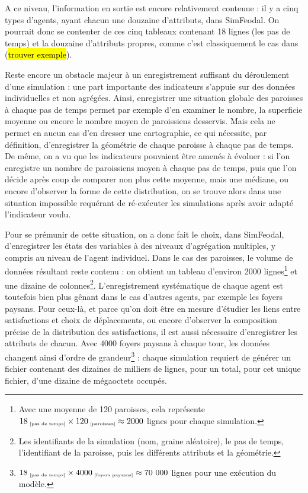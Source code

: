 	A ce niveau, l'information en sortie est encore relativement contenue : il y a cinq types d'agents, ayant chacun une douzaine d'attributs, dans SimFeodal. On pourrait donc se contenter de ces cinq tableaux contenant 18 lignes (les pas de temps) et la douzaine d'attributs propres, comme c'est classiquement le cas dans (\hl{trouver exemple}).

	Reste encore un obstacle majeur à un enregistrement suffisant du déroulement d'une simulation : une part importante des indicateurs s'appuie sur des données individuelles et non agrégées.
	Ainsi, enregistrer une situation globale des paroisses à chaque pas de temps permet par exemple d'en examiner le nombre, la superficie moyenne ou encore le nombre moyen de paroissiens desservis.
	Mais cela ne permet en aucun cas d'en dresser une cartographie, ce qui nécessite, par définition, d'enregistrer la géométrie de chaque paroisse à chaque pas de temps.
	De même, on a vu que les indicateurs pouvaient être amenés à évoluer : si l'on enregistre un nombre de paroissiens moyen à chaque pas de temps, puis que l'on décide après coup de comparer non plus cette moyenne, mais une médiane, ou encore d'observer la forme de cette distribution, on se trouve alors dans une situation impossible requérant de ré-exécuter les simulations après avoir adapté l'indicateur voulu.

	Pour se prémunir de cette situation, on a donc fait le choix, dans SimFeodal, d'enregistrer les états des variables à des niveaux d'agrégation multiples, y compris au niveau de l'agent individuel. Dans le cas des paroisses, le volume de données résultant reste contenu : on obtient un tableau d'environ 2000 lignes\footnote{
	Avec une moyenne de 120 paroisses, cela représente $18_{\text{\tiny ~[pas de temps]}} \times 120_{\text{\tiny ~[paroisses]}} \approx 2000$ lignes pour chaque simulation.
	} et une dizaine de colonnes\footnote{
	Les identifiants de la simulation (nom, graine aléatoire), le pas de temps, l'identifiant de la paroisse, puis les différents attributs et la géométrie.
	}.
	L'enregistrement systématique de chaque agent est toutefois bien plus gênant dans le cas d'autres agents, par exemple les foyers paysans. Pour ceux-là, et parce qu'on doit être en mesure d'étudier les liens entre satisfactions et choix de déplacements, ou encore d'observer la composition précise de la distribution des satisfactions, il est aussi nécessaire d'enregistrer les attributs de chacun. Avec $4000$ foyers paysans à chaque tour, les données changent ainsi d'ordre de grandeur\footnote{
	$18_{\text{\tiny ~[pas de temps]}} \times 4000_{\text{\tiny ~[foyers paysans]}} \approx 70~000$ lignes pour une exécution du modèle.
	} : chaque simulation requiert de générer un fichier contenant des dizaines de milliers de lignes, pour un total, pour cet unique fichier, d'une dizaine de mégaoctets occupés.

